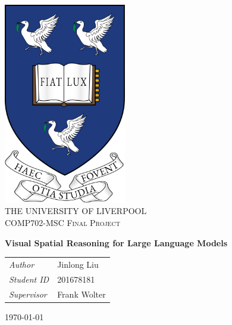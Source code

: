 \begin{titlepage}
\vbox{ }
\vbox{ }
\begin{center}

\includegraphics[width=0.40\textwidth]{liverpool.png}\\[1cm]

\textsc{\LARGE THE UNIVERSITY OF LIVERPOOL}\\[1.5cm]
\textsc{\Large COMP702-MSC Final Project}\\[0.5cm]
\vbox{ }



\huge \bfseries Visual Spatial Reasoning for Large Language Models\\[0.4cm]


\begin{table}[h]
\large
    \centering
    \begin{tabular}{ll}
        \emph{Author} & Jinlong Liu \\
        \emph{Student ID} & 201678181\\
        \emph{Supervisor} &  Frank Wolter \\
    \end{tabular}
\end{table}

\vfill
{\large \today}
\end{center}
\end{titlepage}